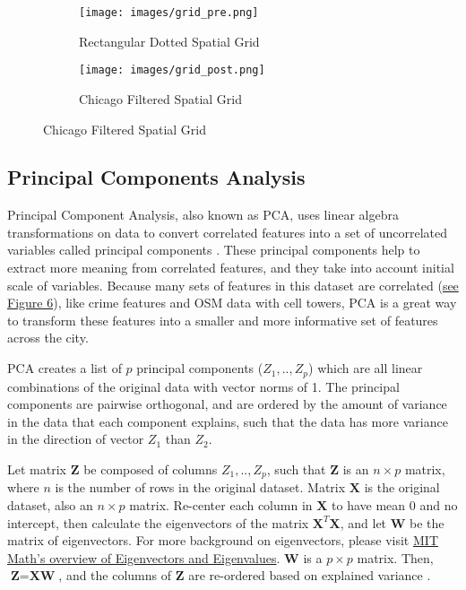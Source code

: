 \documentclass[times new roman,12pt]{article}
\begin{document}
\begin{figure}[H]
\centering
\caption{Spatial Grid Generation and Filtering}
\begin{subfigure}[t]{.375\textwidth}
\centering
  \texttt{[image: images/grid\_pre.png]}
  \caption{Rectangular Dotted Spatial Grid}
  \label{fig:grid_pre}
\end{subfigure}%
\begin{subfigure}[t]{.375\textwidth}
\centering
  \texttt{[image: images/grid\_post.png]}
  \caption{Chicago Filtered Spatial Grid}
  \label{fig:grid_post}
\end{subfigure}
\end{figure}

\subsection{Principal Components Analysis}

Principal Component Analysis, also known as PCA, uses linear algebra transformations on data to convert correlated features into a set of uncorrelated variables called principal components \cite{hotelling1992relations}. These principal components help to extract more meaning from correlated features, and they take into account initial scale of variables. Because many sets of features in this dataset are correlated (\hyperref[correlation]{see Figure 6}), like crime features and OSM data with  cell towers, PCA is a great way to transform these features into a smaller and more informative set of features across the city.

PCA creates a list of $p$ principal components ($Z_1,..,Z_p$) which are all linear combinations of the original data with vector norms of 1. The principal components are pairwise orthogonal, and are ordered by the amount of variance in the data that each component explains, such that the data has more variance in the direction of vector $Z_1$ than $Z_2$.

Let matrix $\textbf{Z}$ be composed of columns $Z_1,..,Z_p$, such that $\textbf{Z}$ is an $n \times p$ matrix, where $n$ is the number of rows in the original dataset. Matrix $\textbf{X}$ is the original dataset, also an $n \times p$ matrix. Re-center each column in $\textbf{X}$ to have mean 0 and no intercept, then calculate the eigenvectors of the matrix $\textbf{X}^T \textbf{X}$, and let $\textbf{W}$ be the matrix of eigenvectors. For more background on eigenvectors, please visit \href{http://math.mit.edu/~gs/linearalgebra/ila0601.pdf}{MIT Math's overview of Eigenvectors and Eigenvalues}. $\textbf{W}$ is a $p \times p$ matrix. Then, $\textbf{Z}=\textbf{X}\textbf{W}$, and the columns of $\textbf{Z}$ are re-ordered based on explained variance \cite{JolliffeI.T2002Pca}.
\end{document}
